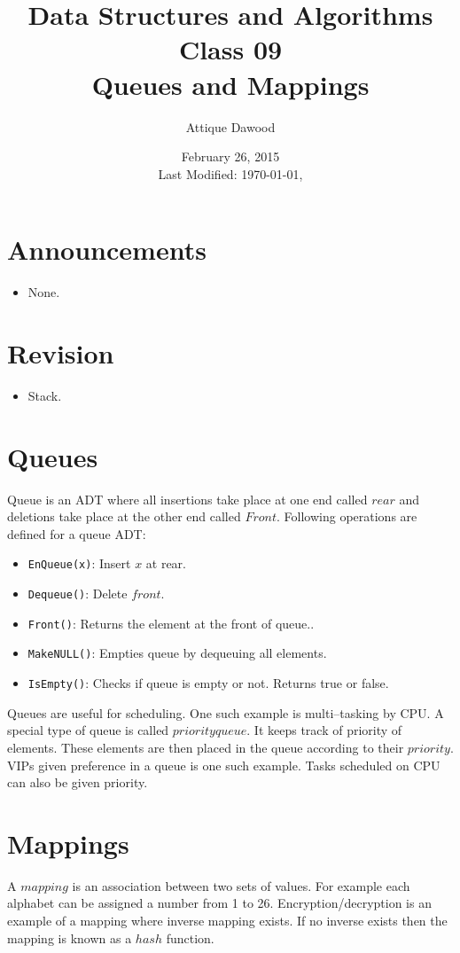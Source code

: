 \documentclass[12pt,a4paper]{article}
\title{Data Structures and Algorithms\\Class 09\\Queues and Mappings}
\author{Attique Dawood}
\date{February 26, 2015\\[0.2cm] Last Modified: \today, \currenttime}
\begin{document}
\maketitle
\section{Announcements}
\begin{itemize}
\item None.
\end{itemize}
\section{Revision}
\begin{itemize}
\item Stack.
\end{itemize}
\section{Queues~\cite[Sec. 2.4]{Aho}}
Queue is an ADT where all insertions take place at one end called $rear$ and deletions take place at the other end called $Front$. Following operations are defined for a queue ADT:
\begin{itemize}
\item \verb|EnQueue(x)|: Insert $x$ at rear.
\item \verb|Dequeue()|: Delete $front$.
\item \verb|Front()|: Returns the element at the front of queue..
\item \verb|MakeNULL()|: Empties queue by dequeuing all elements.
\item \verb|IsEmpty()|: Checks if queue is empty or not. Returns true or false.
\end{itemize}
Queues are useful for scheduling. One such example is multi--tasking by CPU. A special type of queue is called $priority queue$. It keeps track of priority of elements. These elements are then placed in the queue according to their $priority$. VIPs given preference in a queue is one such example. Tasks scheduled on CPU can also be given priority.
\section{Mappings~\cite[Sec. 2.5]{Aho}}
A $mapping$ is an association between two sets of values. For example each alphabet can be assigned a number from 1 to 26. Encryption/decryption is an example of a mapping where inverse mapping exists. If no inverse exists then the mapping is known as a $hash$ function.


\end{document}
